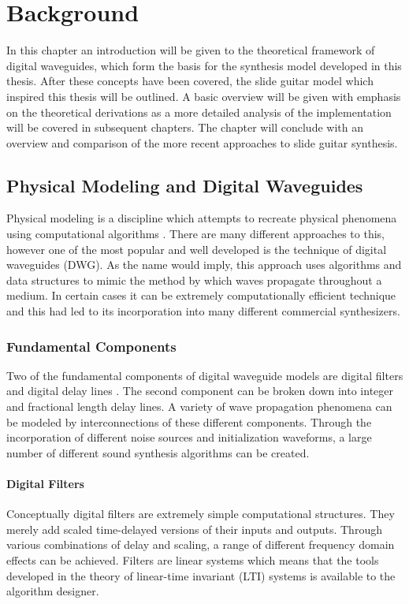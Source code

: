 \documentclass[main.tex]{subfiles}
\begin{document}
\chapter{Background}
\label{ch:background}
In this chapter an introduction will be given to the theoretical framework of digital waveguides, which form the basis for the synthesis model developed in this thesis. After these concepts have been covered, the slide guitar model which inspired this thesis will be outlined. A basic overview will be given with emphasis on the theoretical derivations as a more detailed analysis of the implementation will be covered in subsequent chapters. The chapter will conclude with an overview and comparison of the more recent approaches to slide guitar synthesis.

\section{Physical Modeling and Digital Waveguides}
Physical modeling is a discipline which attempts to recreate physical phenomena using computational algorithms . There are many different approaches to this, however one of the most popular and well developed is the technique of digital waveguides (DWG). As the name would imply, this approach uses algorithms and data structures to mimic the method by which waves propagate throughout a medium. In certain cases it can be extremely computationally efficient technique and this had led to its incorporation into many different commercial synthesizers.

\subsection{Fundamental Components}
Two of the fundamental components of digital waveguide models are digital filters and digital delay lines . The second component can be broken down into integer and fractional length delay lines. A variety of wave propagation phenomena can be modeled by interconnections of these different components. Through the incorporation of different noise sources and initialization waveforms, a large number of different sound synthesis algorithms can be created.

\subsubsection{Digital Filters}
Conceptually digital filters are extremely simple computational structures. They merely add scaled time-delayed versions of their inputs and outputs. Through various combinations of delay and scaling, a range of different frequency domain effects can be achieved. Filters are linear systems which means that the tools developed in the theory of linear-time invariant (LTI) systems is available to the algorithm designer. 
\end{document}
